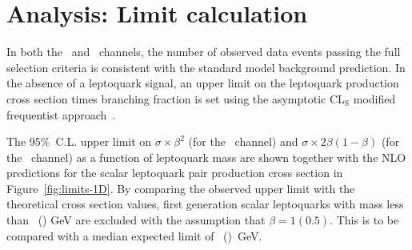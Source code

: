 \chapter{Analysis: Limit calculation}
\label{ch:limit}

In both the \eejj~and \enujj~channels, 
the number of observed data events passing the full selection criteria is consistent with the 
standard model background prediction.
In the absence of a leptoquark signal, an upper limit on the leptoquark production cross section times 
branching fraction is set using the asymptotic CL$_{\text{S}}$ modified frequentist 
approach~\cite{cls-1,cls-2}.

The 95\%~C.L. upper limit on $\sigma \times \beta^2$ (for the \eejj~channel) and 
$\sigma \times 2\beta(1-\beta)$ (for the \enujj~channel) as a function of 
leptoquark mass are shown together with the NLO predictions for the scalar leptoquark pair production cross section 
in Figure~\ref{fig:limits-1D}.
By comparing the observed upper limit with the theoretical cross section values, 
first generation scalar leptoquarks with mass less 
than \ObservedLimitBetaOneeejj~(\ObservedLimitBetaHalfenujj) GeV are excluded
with the assumption that $\beta = 1(0.5)$. This is to be compared with 
a median expected limit of \ExpectedLimitBetaOneeejj~(\ExpectedLimitBetaHalfenujj)~GeV.

